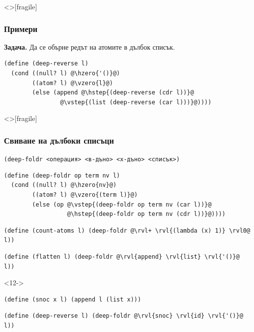 \documentclass[alsotrans,beameroptions={aspectratio=169}]{beamerswitch}
\newcommand{\hzero}{\textcolor{red}}
\newcommand{\vzero}{\textcolor{orange}}
\newcommand{\hstep}{\textcolor{green}}
\newcommand{\vstep}{\textcolor{cyan}}
\begin{document}
\begin{frame}<>[fragile]
  \frametitle{Примери}

  \textbf{Задача.} Да се обърне редът на атомите в дълбок списък.\\
  \pause
\begin{lstlisting}
(define (deep-reverse l)
  (cond ((null? l) @\hzero{'()}@)
        ((atom? l) @\vzero{l}@)
        (else (append @\hstep{(deep-reverse (cdr l))}@
                @\vstep{(list (deep-reverse (car l)))}@))))
\end{lstlisting}
\end{frame}

\begin{frame}<>[fragile]
  \frametitle{Свиване на дълбоки списъци}

  \tt{(deep-foldr }<операция> <в-дъно> <х-дъно> <списък>\tt)\\
  \pause
  \onslide<+->
\begin{lstlisting}
(define (deep-foldr op term nv l)
  (cond ((null? l) @\hzero{nv}@)
        ((atom? l) @\vzero{(term l)}@)
        (else (op @\vstep{(deep-foldr op term nv (car l))}@
                  @\hstep{(deep-foldr op term nv (cdr l))}@))))
\end{lstlisting}
  \onslide<+->
\begin{lstlisting}
(define (count-atoms l) (deep-foldr @\rvl+ \rvl{(lambda (x) 1)} \rvl0@ l))
\end{lstlisting}
  \onslide<+->
\begin{lstlisting}
(define (flatten l) (deep-foldr @\rvl{append} \rvl{list} \rvl{'()}@ l))
\end{lstlisting}
  \onslide<+->
  \begin{visibleenv}<12->
\begin{lstlisting}
(define (snoc x l) (append l (list x)))\end{lstlisting}%
  \end{visibleenv}%
\begin{lstlisting}
(define (deep-reverse l) (deep-foldr @\rvl{snoc} \rvl{id} \rvl{'()}@ l))
\end{lstlisting}
\end{frame}
\end{document}

